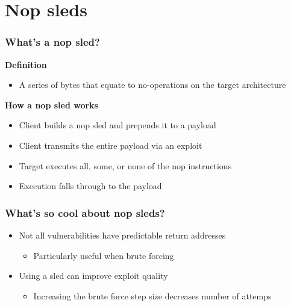 \documentclass{beamer}
\newenvironment{sitemize}{\vspace{1mm}\begin{itemize}\itemsep 4pt\small}{\end{itemize}}
\begin{document}
\section{Nop sleds}

%

\begin{frame}[t]
    \frametitle{What's a nop sled?}

    \textbf{Definition}
    \begin{sitemize}
        \item A series of bytes that equate to no-operations on the
        target architecture
    \end{sitemize}

    \pause
    \textbf{How a nop sled works}
    \begin{sitemize}
        \pause
        \item Client builds a nop sled and prepends it to a payload
        \pause
        \item Client transmits the entire payload via an exploit
        \pause
        \item Target executes all, some, or none of the nop
        instructions
        \pause
        \item Execution falls through to the payload
    \end{sitemize}

\end{frame}

\begin{frame}[t]
    \frametitle{What's so cool about nop sleds?}

    \begin{sitemize}
        \item Not all vulnerabilities have predictable return
        addresses
        \begin{sitemize}
            \item Particularly useful when brute forcing
        \end{sitemize}

        \pause
        \item Using a sled can improve exploit quality
        \begin{sitemize}
            \item Increasing the brute force step size decreases
	    number of attemps
        \end{sitemize}
    \end{sitemize}
\end{frame}
\end{document}
